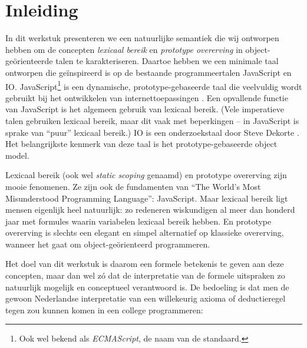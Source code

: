 
\chapter{Inleiding}

In dit werkstuk presenteren we een natuurlijke semantiek die wij ontworpen hebben om de concepten \emph{lexicaal bereik} en \emph{prototype overerving} in object-geörienteerde talen te karakteriseren. Daartoe hebben we een minimale taal ontworpen die geïnspireerd is op de bestaande programmeertalen JavaScript en IO. JavaScript\footnote{Ook wel bekend als \emph{ECMAScript}, de naam van de standaard.} is een dynamische, prototype-gebaseerde taal die veelvuldig wordt gebruikt bij het ontwikkelen van internettoepassingen \citep{javascript}. Een opvallende functie van JavaScript is het algemeen gebruik van lexicaal bereik. (Vele imperatieve talen gebruiken lexicaal bereik, maar dit vaak met beperkingen -- in JavaScript is sprake van ``puur'' lexicaal bereik.) IO is een onderzoekstaal door Steve Dekorte \citep{io}. Het belangrijkste kenmerk van deze taal is het prototype-gebaseerde object model.

Lexicaal bereik (ook wel \emph{static scoping} genaamd) en prototype overerving zijn mooie fenomenen. Ze zijn ook de fundamenten van “The World's Most Misunderstood Programming Language”: JavaScript. Maar lexicaal bereik ligt mensen eigenlijk heel natuurlijk: zo redeneren wiskundigen al meer dan honderd jaar met formules waarin variabelen lexicaal bereik hebben. En prototype overerving is slechts een elegant en simpel alternatief op klassieke overerving, wanneer het gaat om object-geörienteerd programmeren.

Het doel van dit werkstuk is daarom een formele betekenis te geven aan deze concepten, maar dan wel zó dat de interpretatie van de formele uitspraken zo natuurlijk mogelijk en conceptueel verantwoord is. De bedoeling is dat men de gewoon Nederlandse interpretatie van een willekeurig axioma of deductieregel tegen zou kunnen komen in een college programmeren:

